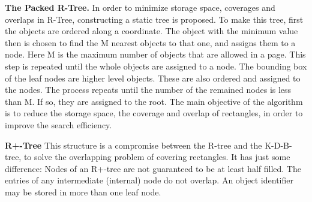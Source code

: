 \documentclass[a4paper,12pt]{article}
\begin{document}

\textbf{The Packed R-Tree.}
In order to minimize storage space, coverages and overlaps in R-Tree, constructing a static tree is proposed. To make this tree, first the objects are ordered along a coordinate. The object with the minimum value then is chosen to find the M nearest objects to that one, and assigns them to a node. Here M is the maximum number of objects that are allowed in a page. This step is repeated until the whole objects are assigned to a node. The bounding box of the leaf nodes are higher level objects. These are also ordered and assigned to the nodes. The process repeats until the number of the remained nodes is less than M. If so, they are assigned to the root. The main objective of the algorithm is to reduce the storage space, the coverage and overlap of rectangles, in order to improve the search efficiency.

\textbf{R+-Tree}
This structure is a compromise between the R-tree and the K-D-B-tree, to solve the overlapping problem of covering rectangles. It has just some difference:
Nodes of an R+-tree are not guaranteed to be at least half filled.
 The entries of any intermediate (internal) node do not overlap.
 An object identifier may be stored in more than one leaf node.
\end{document}
